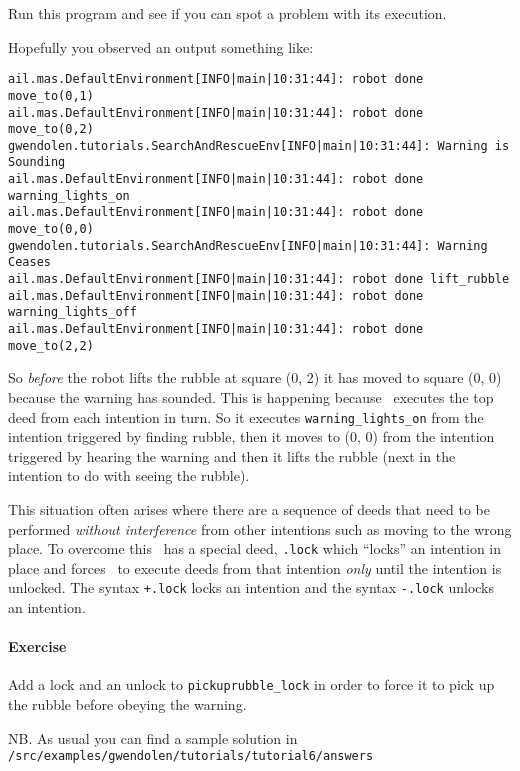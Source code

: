 Run this program and see if you can spot a problem with its execution.

Hopefully you observed an output something like:
\begin{verbatim}
ail.mas.DefaultEnvironment[INFO|main|10:31:44]: robot done move_to(0,1) 
ail.mas.DefaultEnvironment[INFO|main|10:31:44]: robot done move_to(0,2) 
gwendolen.tutorials.SearchAndRescueEnv[INFO|main|10:31:44]: Warning is Sounding 
ail.mas.DefaultEnvironment[INFO|main|10:31:44]: robot done warning_lights_on 
ail.mas.DefaultEnvironment[INFO|main|10:31:44]: robot done move_to(0,0) 
gwendolen.tutorials.SearchAndRescueEnv[INFO|main|10:31:44]: Warning Ceases 
ail.mas.DefaultEnvironment[INFO|main|10:31:44]: robot done lift_rubble 
ail.mas.DefaultEnvironment[INFO|main|10:31:44]: robot done warning_lights_off 
ail.mas.DefaultEnvironment[INFO|main|10:31:44]: robot done move_to(2,2) 
\end{verbatim}
So \emph{before} the robot lifts the rubble at square (0, 2) it has moved to square (0, 0) because the warning has sounded.  This is happening because \gwendolen\ executes the top deed from each intention in turn.  So it executes \lstinline{warning_lights_on} from the intention triggered by finding rubble, then it moves to (0, 0) from the intention triggered by hearing the warning and then it lifts the rubble (next in the intention to do with seeing the rubble).

This situation often arises where there are a sequence of deeds that need to be performed \emph{without interference} from other intentions such as moving to the wrong place.  To overcome this \gwendolen\ has a special deed, \lstinline{.lock} which ``locks'' an intention in place and forces \gwendolen\ to execute deeds from that intention \emph{only} until the intention is unlocked.  The syntax \lstinline{+.lock} locks an intention and the syntax \lstinline{-.lock} unlocks an intention.

\paragraph{Exercise} Add a lock and an unlock to \verb+pickuprubble_lock+ in order to force it to pick up the rubble before obeying the warning.

\begin{sloppypar}
NB. As usual you can find a sample solution in \texttt{/src/examples/gwendolen/tutorials/tutorial6/answers}
\end{sloppypar}

